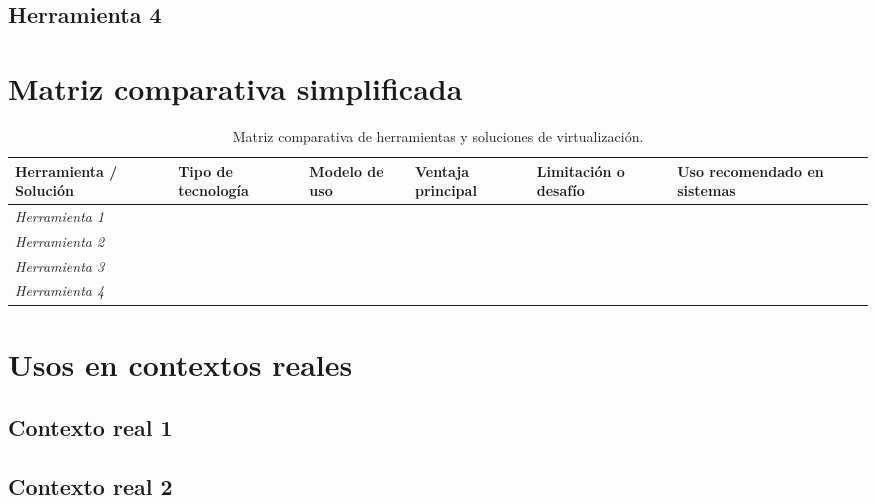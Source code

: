 \documentclass[12pt,a4paper]{article}
\begin{document}
\subsection{Herramienta 4}

\section{Matriz comparativa simplificada}
\label{sec:matriz}

\begin{table}[htbp]
  \caption{Matriz comparativa de herramientas y soluciones de virtualización.}
  \label{tab:matriz-comparativa}
  \footnotesize 
  \renewcommand{\arraystretch}{1.5} %
  \begin{tabularx}{\textwidth}{@{} Y Y Y Y Y Y @{}}
    \toprule
    \textbf{Herramienta / Solución}
      & \textbf{Tipo de tecnología}
      & \textbf{Modelo de uso}
      & \textbf{Ventaja principal}
      & \textbf{Limitación o desafío}
      & \textbf{Uso recomendado en sistemas} \\ %
    \midrule
    \textit{Herramienta 1} & & & & & \\[2pt]
    \textit{Herramienta 2} & & & & & \\[2pt]
    \textit{Herramienta 3} & & & & & \\[2pt]
    \textit{Herramienta 4} & & & & & \\
    \bottomrule
  \end{tabularx}
\end{table}

\section{Usos en contextos reales}
\label{sec:usos}

\subsection{Contexto real 1}

\subsection{Contexto real 2}
\end{document}
